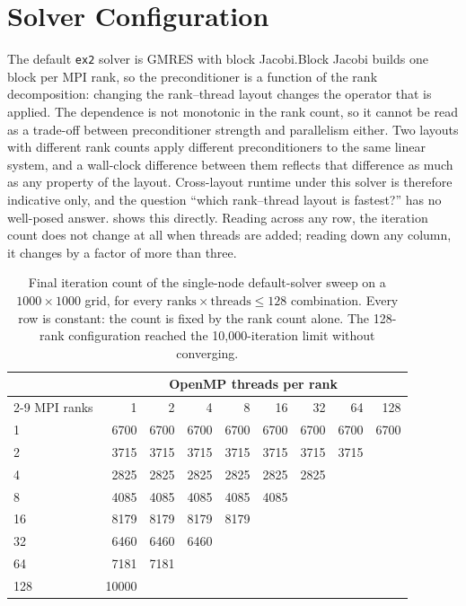 \documentclass[12pt,a4paper,notitlepage]{report}
\begin{document}
\section{Solver Configuration}
The default \texttt{ex2} solver is GMRES with block Jacobi.Block Jacobi builds one block per MPI rank, so the preconditioner is a function of the rank
decomposition: changing the rank--thread layout changes the operator that is applied.
The dependence is not monotonic in the rank count, so it cannot be read as a
trade-off between preconditioner strength and parallelism either. Two layouts with
different rank counts apply different preconditioners to the same linear system, and a
wall-clock difference between them reflects that difference as much as any property of the
layout. Cross-layout runtime under this solver is therefore indicative only, and the
question ``which rank--thread layout is fastest?'' has no well-posed answer.
 shows this directly. Reading across any row, the iteration count
does not change at all when threads are added; reading down any column, it changes by a
factor of more than three.

\begin{table}[htbp]
  \centering
  \caption{Final iteration count of the single-node default-solver sweep on a
  $1000\times1000$ grid, for every $\text{ranks}\times\text{threads}\leq128$ combination.
  Every row is constant: the count is fixed by the rank count alone. The 128-rank
  configuration reached the 10,000-iteration limit without converging.}
  \label{tab:iterations-rank}
  \begin{tabular}{lrrrrrrrr}
    \toprule
    & \multicolumn{8}{c}{OpenMP threads per rank} \\
    \cmidrule(lr){2-9}
    MPI ranks & 1 & 2 & 4 & 8 & 16 & 32 & 64 & 128 \\
    \midrule
    1   &  6700 & 6700 & 6700 & 6700 & 6700 & 6700 & 6700 & 6700 \\
    2   &  3715 & 3715 & 3715 & 3715 & 3715 & 3715 & 3715 &      \\
    4   &  2825 & 2825 & 2825 & 2825 & 2825 & 2825 &      &      \\
    8   &  4085 & 4085 & 4085 & 4085 & 4085 &      &      &      \\
    16  &  8179 & 8179 & 8179 & 8179 &      &      &      &      \\
    32  &  6460 & 6460 & 6460 &      &      &      &      &      \\
    64  &  7181 & 7181 &      &      &      &      &      &      \\
    128 & 10000 &      &      &      &      &      &      &      \\
    \bottomrule
  \end{tabular}
\end{table}
\end{document}
